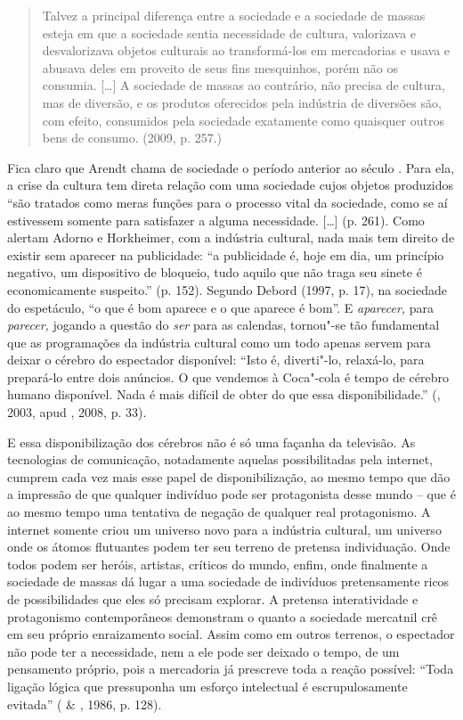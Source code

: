 {\begin{quote}
Talvez a principal diferença entre a sociedade e a sociedade de massas
esteja em que a sociedade sentia necessidade de cultura, valorizava e
desvalorizava objetos culturais ao transformá-los em mercadorias e usava
e abusava deles em proveito de seus fins mesquinhos, porém não os
consumia. [\ldots{}] A sociedade de massas ao contrário, não precisa
de cultura, mas de diversão, e os produtos oferecidos pela indústria de
diversões são, com efeito, consumidos pela sociedade exatamente como
quaisquer outros bens de consumo. (2009, p. 257.)
\end{quote}

Fica claro que Arendt chama de sociedade o período anterior ao século
. Para ela, a crise da cultura tem direta relação com uma sociedade
cujos objetos produzidos ``são tratados como meras funções para o
processo vital da sociedade, como se aí estivessem somente para
satisfazer a alguma necessidade. [\ldots{}] (p. 261). Como alertam
Adorno e Horkheimer, com a indústria cultural, nada mais tem
direito de existir sem aparecer na publicidade: ``a publicidade é, hoje
em dia, um princípio negativo, um dispositivo de bloqueio, tudo aquilo
que não traga seu sinete é economicamente suspeito.'' (p. 152). Segundo
Debord (1997, p. 17), na sociedade do espetáculo, ``o que é bom aparece
e o que aparece é bom''. E \emph{aparecer,} para \emph{parecer,}
jogando a questão do \emph{ser} para as calendas, tornou"-se tão
fundamental que as programações da indústria cultural como um todo
apenas servem para deixar o cérebro do espectador disponível: ``Isto é,
diverti"-lo, relaxá-lo, para prepará-lo entre dois anúncios. O que
vendemos à Coca"-cola é tempo de cérebro humano disponível. Nada é mais
difícil de obter do que essa disponibilidade.'' (, 2003, apud
, 2008, p. 33).

E essa disponibilização dos cérebros não é só uma façanha da televisão.
As tecnologias de comunicação, notadamente aquelas possibilitadas pela
internet, cumprem cada vez mais esse papel de disponibilização, ao mesmo
tempo que dão a impressão de que qualquer indivíduo pode ser
protagonista desse mundo -- que é ao mesmo tempo uma tentativa de
negação de qualquer real protagonismo. A internet somente criou um
universo novo para a indústria cultural, um universo onde os átomos
flutuantes podem ter seu terreno de pretensa individuação. Onde todos
podem ser heróis, artistas, críticos do mundo, enfim, onde finalmente a
sociedade de massas dá lugar a uma sociedade de indivíduos pretensamente
ricos de possibilidades que eles só precisam explorar. A pretensa
interatividade e protagonismo contemporâneos demonstram o quanto a
sociedade mercatnil crê em seu próprio enraizamento social. Assim como
em outros terrenos, o espectador não pode ter a necessidade, nem a ele
pode ser deixado o tempo, de um pensamento próprio, pois a mercadoria já
prescreve toda a reação possível: ``Toda ligação lógica que pressuponha
um esforço intelectual é escrupulosamente evitada'' ( \&
, 1986, p. 128).

}
